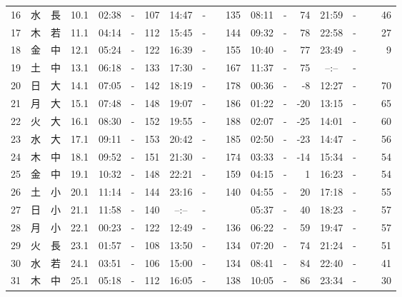 \documentclass[12pt,a4j]{jsarticle}
\begin{document}
\begin{table}[htbp]
\begin{center}
\begin{tabular}{|rc|cr|ccrccr|ccrccr|}
16 & 水 & 長 & 10.1 &  02:38 &-& 107  &  14:47 &-& 135  &   08:11 &-&  74  &   21:59 &-&  46  \\
17 & 木 & 若 & 11.1 &  04:14 &-& 112  &  15:45 &-& 144  &   09:32 &-&  78  &   22:58 &-&  27  \\
18 & 金 & 中 & 12.1 &  05:24 &-& 122  &  16:39 &-& 155  &   10:40 &-&  77  &   23:49 &-&   9  \\
19 & 土 & 中 & 13.1 &  06:18 &-& 133  &  17:30 &-& 167  &   11:37 &-&  75  &   --:-- &-&~~~~~ \\
20 & 日 & 大 & 14.1 &  07:05 &-& 142  &  18:19 &-& 178  &   00:36 &-&  -8  &   12:27 &-&  70  \\
21 & 月 & 大 & 15.1 &  07:48 &-& 148  &  19:07 &-& 186  &   01:22 &-& -20  &   13:15 &-&  65  \\
22 & 火 & 大 & 16.1 &  08:30 &-& 152  &  19:55 &-& 188  &   02:07 &-& -25  &   14:01 &-&  60  \\
23 & 水 & 大 & 17.1 &  09:11 &-& 153  &  20:42 &-& 185  &   02:50 &-& -23  &   14:47 &-&  56  \\
24 & 木 & 中 & 18.1 &  09:52 &-& 151  &  21:30 &-& 174  &   03:33 &-& -14  &   15:34 &-&  54  \\
25 & 金 & 中 & 19.1 &  10:32 &-& 148  &  22:21 &-& 159  &   04:15 &-&   1  &   16:23 &-&  54  \\
26 & 土 & 小 & 20.1 &  11:14 &-& 144  &  23:16 &-& 140  &   04:55 &-&  20  &   17:18 &-&  55  \\
27 & 日 & 小 & 21.1 &  11:58 &-& 140  &  --:-- &-&~~~~~ &   05:37 &-&  40  &   18:23 &-&  57  \\
28 & 月 & 小 & 22.1 &  00:23 &-& 122  &  12:49 &-& 136  &   06:22 &-&  59  &   19:47 &-&  57  \\
29 & 火 & 長 & 23.1 &  01:57 &-& 108  &  13:50 &-& 134  &   07:20 &-&  74  &   21:24 &-&  51  \\
30 & 水 & 若 & 24.1 &  03:51 &-& 106  &  15:00 &-& 134  &   08:41 &-&  84  &   22:40 &-&  41  \\
31 & 木 & 中 & 25.1 &  05:18 &-& 112  &  16:05 &-& 138  &   10:05 &-&  86  &   23:34 &-&  30  \\
   \hline
   \end{tabular}
   \end{center}
\end{table}
\newpage
\end{document}
